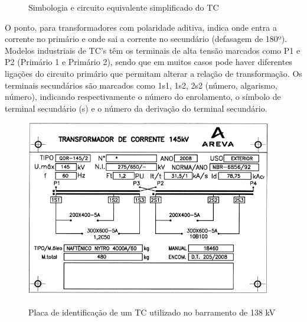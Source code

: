 \documentclass[a5paper,english,spanish,brazil]{ufsc-thesis}
\begin{document}
\begin{figure}[htb]
  \caption{Simbologia e circuito equivalente simplificado do TC}
  \label{fig:tca}
  \centering
\end{figure}\par
O ponto, para transformadores com polaridade aditiva, indica onde entra a corrente no primário e onde sai a corrente no secundário (defasagem de 180º). Modelos industriais de TC’s têm os terminais de alta tensão marcados como P1 e P2 (Primário 1 e Primário 2), sendo que em muitos casos pode haver diferentes ligações do circuito primário que permitam alterar a relação de transformação. Os terminais secundários são marcados como 1s1, 1s2, 2s2 (número, algarismo, número), indicando respectivamente o número do enrolamento, o símbolo de terminal secundário (s) e o número da derivação do terminal secundário.\par
\begin{figure}[htb]
  \caption{Placa de identificação de um TC utilizado no barramento de 138 kV}
  \centering
  \includegraphics[width=10.8cm]{placatc.jpg}
  \label{fig:placatc}
\end{figure}
\end{document}
